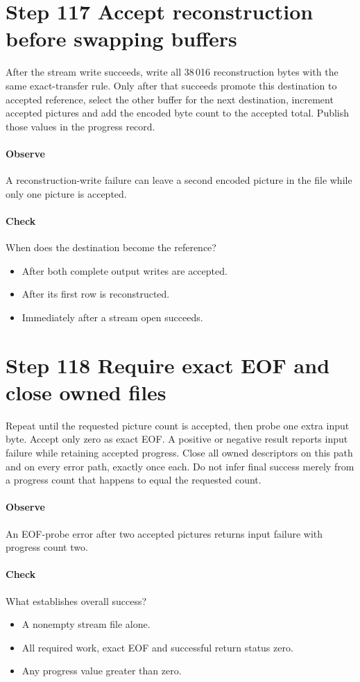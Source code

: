 \section{Step 117 Accept reconstruction before swapping buffers}\label{h263-clip-s07}
After the stream write succeeds, write all 38\,016 reconstruction bytes with the
same exact-transfer rule. Only after that succeeds promote this destination to
accepted reference, select the other buffer for the next destination, increment
accepted pictures and add the encoded byte count to the accepted total. Publish
those values in the progress record.

\paragraph{Observe} A reconstruction-write failure can leave a second encoded picture in the file while only one picture is accepted.
\paragraph{Check} When does the destination become the reference?
\begin{itemize}
  \item[A.] After both complete output writes are accepted.
  \item[B.] After its first row is reconstructed.
  \item[C.] Immediately after a stream open succeeds.
\end{itemize}

\section{Step 118 Require exact EOF and close owned files}\label{h263-clip-s08}
Repeat until the requested picture count is accepted, then probe one extra input
byte. Accept only zero as exact EOF. A positive or negative result reports input
failure while retaining accepted progress. Close all owned descriptors on this
path and on every error path, exactly once each. Do not infer final success merely
from a progress count that happens to equal the requested count.

\paragraph{Observe} An EOF-probe error after two accepted pictures returns input failure with progress count two.
\paragraph{Check} What establishes overall success?
\begin{itemize}
  \item[A.] A nonempty stream file alone.
  \item[B.] All required work, exact EOF and successful return status zero.
  \item[C.] Any progress value greater than zero.
\end{itemize}

